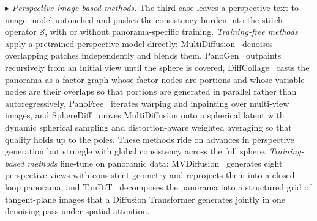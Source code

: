 $\blacktriangleright$ \textit{Perspective image-based methods.} The third case leaves a perspective text-to-image model untouched and pushes the consistency burden into the stitch operator $\mathcal{S}$, with or without panorama-specific training.
\emph{Training-free methods} apply a pretrained perspective model directly: MultiDiffusion~\cite{multidiffusion} denoises overlapping patches independently and blends them, PanoGen~\cite{li2023panogen} outpaints recursively from an initial view until the sphere is covered, DiffCollage~\cite{zhang2023diffcollage} casts the panorama as a factor graph whose factor nodes are portions and whose variable nodes are their overlaps so that portions are generated in parallel rather than autoregressively, PanoFree~\cite{panofree} iterates warping and inpainting over multi-view images, and SphereDiff~\cite{park2025spherediff} moves MultiDiffusion onto a spherical latent with dynamic spherical sampling and distortion-aware weighted averaging so that quality holds up to the poles.
These methods ride on advances in perspective generation but struggle with global consistency across the full sphere.
\emph{Training-based methods} fine-tune on panoramic data: MVDiffusion~\cite{tang2023MVDiffusion} generates eight perspective views with consistent geometry and reprojects them into a closed-loop panorama, and TanDiT~\cite{tandit2025} decomposes the panorama into a structured grid of tangent-plane images that a Diffusion Transformer generates jointly in one denoising pass under spatial attention.


